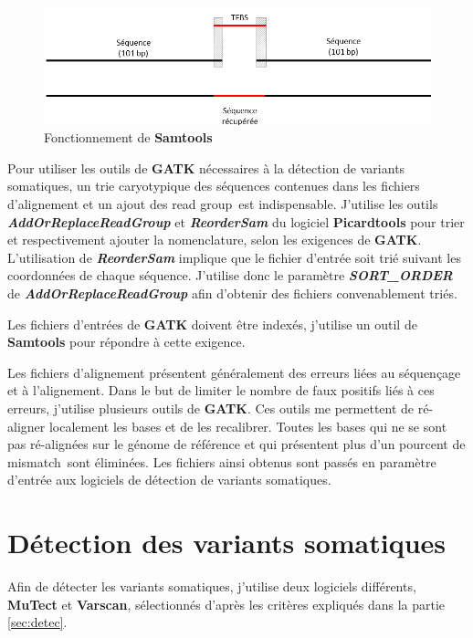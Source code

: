 \begin{figure}[h]
\centering
\includegraphics[scale=0.5]{Figures/sequence.png}
\caption{Fonctionnement de \textbf{Samtools}}
\label{fig:sequence}
\end{figure}

Pour utiliser les outils de \textbf{GATK} nécessaires à la détection de variants somatiques, un trie caryotypique des séquences contenues dans les fichiers d'alignement et un ajout des \og read group\fg ~est indispensable. J'utilise les outils \textit{\textbf{AddOrReplaceReadGroup}} et \textit{\textbf{ReorderSam}} du logiciel \textbf{Picardtools} pour trier et respectivement ajouter la nomenclature, selon les exigences de \textbf{GATK}. L'utilisation de \textit{\textbf{ReorderSam}} implique que le fichier d'entrée soit trié suivant les coordonnées de chaque séquence. J'utilise donc le paramètre \textit{\textbf{SORT\_ORDER}} de \textit{\textbf{AddOrReplaceReadGroup}} afin d'obtenir des fichiers convenablement triés.

Les fichiers d'entrées de \textbf{GATK} doivent être indexés, j'utilise un outil de \textbf{Samtools} pour répondre à cette exigence.

Les fichiers d'alignement présentent généralement des erreurs liées au séquençage et à l'alignement. Dans le but de limiter le nombre de faux positifs liés à ces erreurs, j'utilise plusieurs outils de \textbf{GATK}. Ces outils me permettent de ré-aligner localement les bases et de les recalibrer. Toutes les bases qui ne se sont pas ré-alignées sur le génome de référence et qui présentent plus d'un pourcent de \og mismatch\fg ~sont éliminées. Les fichiers ainsi obtenus sont passés en paramètre d'entrée aux logiciels de détection de variants somatiques.

\section{Détection des variants somatiques}

Afin de détecter les variants somatiques, j'utilise deux logiciels différents, \textbf{MuTect} et \textbf{Varscan}, sélectionnés d'après les critères expliqués dans la partie \ref{sec:detec}. 

